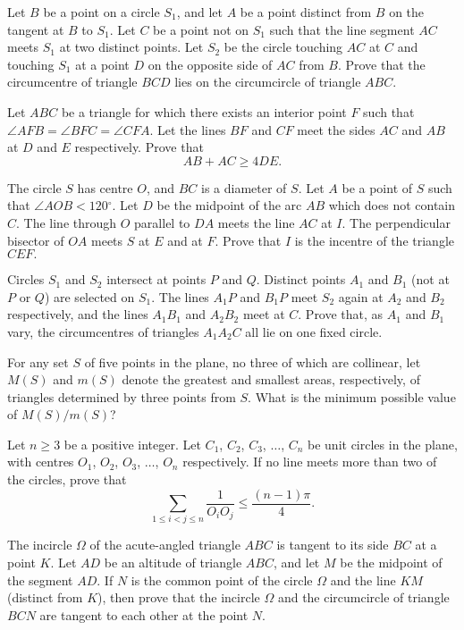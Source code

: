 \item[\textbf{G1.}]Let $B$ be a point on a circle $S_1$,  and let $A$ be a point distinct from $B$ on the tangent at $B$ to $S_1$. Let $C$ be a point not on $S_1$ such that the line segment $AC$ meets $S_1$ at two distinct points. Let $S_2$ be the circle touching $AC$ at $C$ and touching $S_1$ at a point $D$ on the opposite side of $AC$ from $B$.  Prove that the circumcentre of triangle $BCD$ lies on the circumcircle of triangle $ABC$.

\item[\textbf{G2.}]Let $ABC$ be a triangle for which there exists an interior point $F$ such that $\angle AFB=\angle BFC=\angle CFA$. Let the lines $BF$ and $CF$ meet the sides $AC$ and $AB$ at $D$ and $E$ respectively. Prove that \[ AB+AC\geq4DE. \]

\item[\textbf{G3.}]The circle $S$ has centre $O$,  and $BC$ is a diameter of $S$. Let $A$ be a point of $S$ such that $\angle AOB<120{{}^\circ}$.  Let $D$ be the midpoint of the arc $AB$ which does not contain $C$. The line through $O$ parallel to $DA$ meets the line $AC$ at $I$. The perpendicular bisector of $OA$ meets $S$ at $E$ and at $F$. Prove that $I$ is the incentre of the triangle $CEF.$

\item[\textbf{G4.}]Circles $S_1$ and $S_2$ intersect at points $P$ and $Q$. Distinct points $A_1$ and $B_1$ (not at $P$ or $Q$) are selected on $S_1$. The lines $A_1P$ and $B_1P$ meet $S_2$ again at $A_2$ and $B_2$ respectively, and the lines $A_1B_1$ and $A_2B_2$ meet at $C$.  Prove that, as $A_1$ and $B_1$ vary, the circumcentres of triangles $A_1A_2C$ all lie on one fixed circle.

\item[\textbf{G5.}]For any set $S$ of five points in the plane, no three of which are collinear, let $M(S)$ and $m(S)$ denote the greatest and smallest areas, respectively, of triangles determined by three points from $S$.  What is the minimum possible value of $M(S)/m(S)$?

\item[\textbf{G6.}]Let $n\geq3$ be a positive integer. Let $C_1$, $C_2$, $C_3$, $\ldots$, $C_n$ be unit circles in the plane, with centres $O_1$, $O_2$, $O_3$, $\ldots$, $O_n$ respectively. If no line meets more than two of the circles, prove that \[ \sum\limits^{}_{1\leq i<j\leq n}{\frac{1}{O_iO_j}}\leq{\frac{(n-1)\pi}{4}}.  \]

\item[\textbf{G7.}]The incircle $ \Omega$ of the acute-angled triangle $ ABC$ is tangent to its side $ BC$ at a point $ K$. Let $ AD$ be an altitude of triangle $ ABC$,  and let $ M$ be the midpoint of the segment $ AD$. If $ N$ is the common point of the circle $ \Omega$ and the line $ KM$ (distinct from $ K$), then prove that the incircle $ \Omega$ and the circumcircle of triangle $ BCN$ are tangent to each other at the point $ N$.

